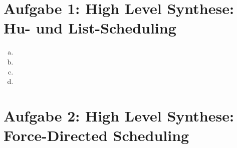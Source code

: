 \documentclass[a4paper]{scrartcl}
\begin{document}
	
\section*{Aufgabe 1: High Level Synthese: Hu- und List-Scheduling}

\begin{enumerate}[(a)]
	\item
	\item
	\item
	\item
\end{enumerate}

\section*{Aufgabe 2: High Level Synthese: Force-Directed Scheduling}
\end{document}
